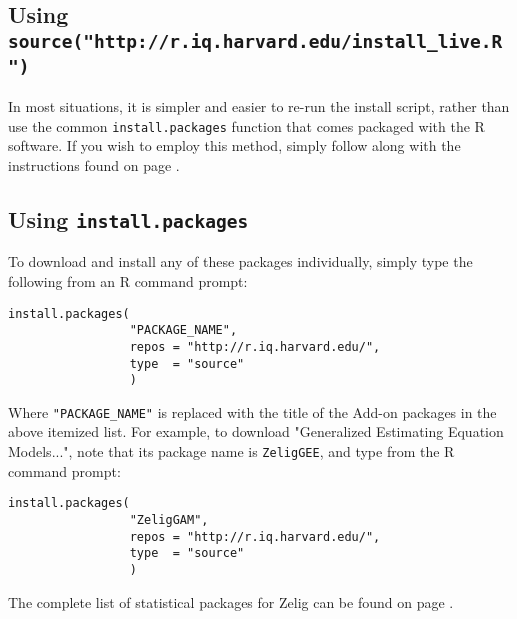 %
\subsection{Using {\tt source("http://r.iq.harvard.edu/install\_live.R")}}

In most situations, it is simpler and easier to re-run the install script,
rather than use the common {\tt install.packages} function that comes packaged
with the R software. If you wish to employ this method, simply follow along
with the instructions found on page \pageref{subsec:custominstall}.



\subsection{Using {\tt install.packages}}

\begin{minipage}{\linewidth}

To download and install any of these packages individually, simply type the
following from an R command prompt:

\begin{verbatim}
install.packages(
                 "PACKAGE_NAME",
                 repos = "http://r.iq.harvard.edu/",
                 type  = "source"
                 )
\end{verbatim}

Where {\tt "PACKAGE\_NAME"} is replaced with the title of the Add-on packages
in the above itemized list. For example, to download "Generalized Estimating
Equation Models...", note that its package name is {\tt ZeligGEE}, and type
from the R command prompt:

\begin{verbatim}
install.packages(
                 "ZeligGAM",
                 repos = "http://r.iq.harvard.edu/",
                 type  = "source"
                 )
\end{verbatim}

The complete list of statistical packages for Zelig can be found on page
\pageref{sec:availablepackages}.


\end{minipage}

%



